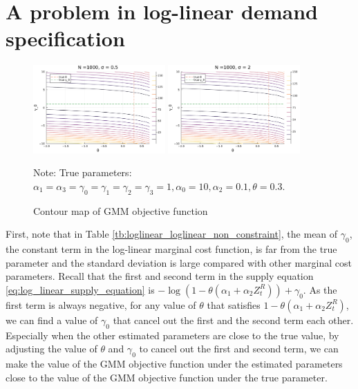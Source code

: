 \documentclass[11pt, a4paper]{article}
\begin{document}
\section{A problem in log-linear demand specification}

\begin{figure}[!htbp]
  \begin{center}
  \includegraphics[width = 0.45\textwidth]
  {figuretable/contour_loglinear_loglinear_n_1000_sigma_0.5.pdf}
  \includegraphics[width = 0.45\textwidth]
  {figuretable/contour_loglinear_loglinear_n_1000_sigma_2.pdf}
  \caption{Contour map of GMM objective function}
  \label{fg:contour_loglinear_loglinear_n_1000_sigma_2} 
  \end{center}
  \footnotesize
  Note: True parameters: $\alpha_1 = \alpha_3 = \gamma_0 = \gamma_1 = \gamma_2  = \gamma_3 = 1, \alpha_0 = 10, \alpha_2 = 0.1,  \theta = 0.3.$
\end{figure} 

First, note that in Table \ref{tb:loglinear_loglinear_non_constraint}, the mean of $\gamma_0$, the constant term in the log-linear marginal cost function, is far from the true parameter and the standard deviation is large compared with other marginal cost parameters. 
Recall that the first and second term in the supply equation \eqref{eq:log_linear_supply_equation} is $-\log(1 - \theta(\alpha_1 + \alpha_2 Z^{R}_{t})) + \gamma_0$.
As the first term is always negative, for any value of $\theta$ that satisfies $1 - \theta(\alpha_1 + \alpha_2 Z^{R}_{t})$, we can find a value of $\gamma_0$ that cancel out the first and the second term each other.
Especially when the other estimated parameters are close to the true value, by adjusting the value of $\theta$ and $\gamma_0$ to cancel out the first and second term, we can make the value of the GMM objective function under the estimated parameters close to the value of the GMM objective function under the true parameter.
\end{document}
